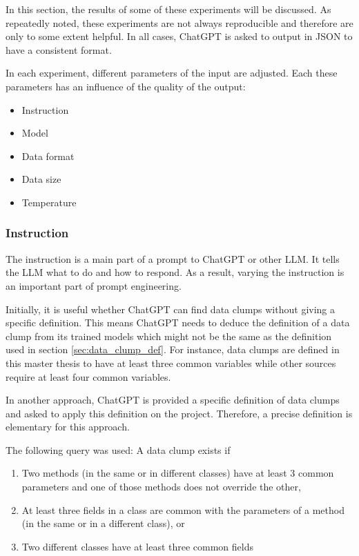 In this section, the results of some of these experiments will be discussed.  As repeatedly noted, these experiments are not always reproducible and therefore are only to some extent helpful. In all cases, ChatGPT is asked to output in \ac{JSON} to have a consistent format.

In each experiment, different parameters of the input are adjusted. Each these parameters has an influence of the quality of the output:

\begin{itemize}
    \item Instruction
    \item Model
    \item Data format
    \item Data size
    \item Temperature
\end{itemize}

\subsubsection{Instruction}\label{sec:llm_instruction}
The instruction is a main part of a prompt to ChatGPT or other \ac{LLM}. It tells the  \ac{LLM} what to do and how to respond. As a result, varying the instruction is an important part of prompt engineering. \newline



Initially, it is useful whether ChatGPT can find data clumps without giving a specific definition. This means ChatGPT needs to deduce the definition of a data clump from its trained models which might not be the same as the definition used in section \ref{sec:data_clump_def}. For instance, data clumps are defined in this master thesis to have at least three common variables while other sources require at least four common variables. 
\begin{comment}
Nevertheless, the results are fairly good. ChatGPT ignores the inheritance between \textit{MathStuff} and \textit{BetterMathStuff} and does not output a data clump for each method in \textit{MathStuff}
\end{comment}


In another approach, ChatGPT is provided a specific definition of data clumps and asked to apply this definition on the project. Therefore, a precise definition is elementary for this approach.

The following query was used:
A data clump exists if
\begin{enumerate}
\item  Two methods (in the same or in different classes) have at least 3 common parameters
    and one of those methods does not override the other, 
\item At least three fields in a class are common with the parameters of a method (in the same or in a different class), or 
\item Two different classes have at least three common fields
\end{enumerate}


